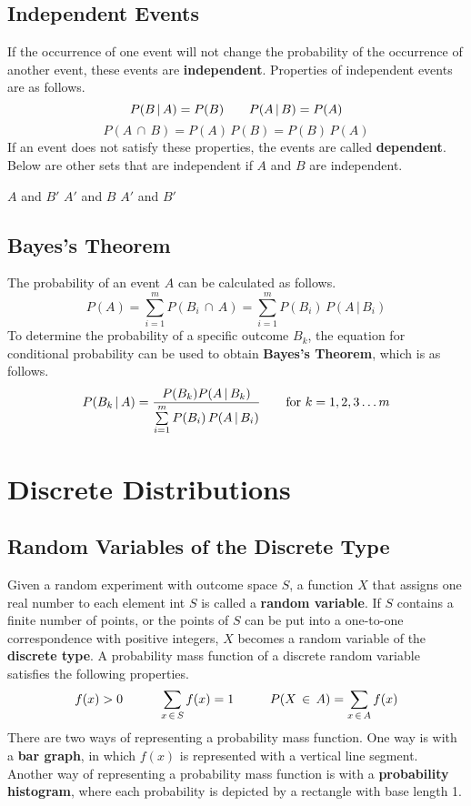 \documentclass{article}
\begin{document}
\subsection{Independent Events}
If the occurrence of one event will not change the probability of the occurrence of another event, these events are \textbf{independent}. Properties of independent events are as follows.
\[P(B\,|\,A)=P(B)\hspace{7 mm}P(A\,|\,B)=P(A)\]
\[P(A\,\cap\,B)=P(A)\,P(B)=P(B)\,P(A)\]
If an event does not satisfy these properties, the events are called \textbf{dependent}. Below are other sets that are independent if \(A\) and \(B\) are independent.
\begin{center}
    \(A\) and \(B'\)\hspace{7 mm}
    \(A'\) and \(B\)\hspace{7 mm}
    \(A'\) and \(B'\)
\end{center}
\subsection{Bayes's Theorem}
The probability of an event \(A\) can be calculated as follows.
\[P(A)=\sum_{i=1}^{m}P(B_i\,\cap\,A)=\sum_{i=1}^{m}P(B_i)\,P(A\,|\,B_i)\]
To determine the probability of a specific outcome \(B_k\), the equation for conditional probability can be used to obtain \textbf{Bayes's Theorem}, which is as follows.
\[P(B_k\,|\,A)=\frac{P(B_k)P(A\,|\,B_k)}{\sum\limits_{i=1}^{m}P(B_i)\,P(A\,|\,B_i)}\hspace{7 mm}\textnormal{for }k=1,2,3\hdots m\]
\section{Discrete Distributions}
\subsection{Random Variables of the Discrete Type}
Given a random experiment with outcome space \(S\), a function \(X\) that assigns one real number to each element int \(S\) is called a \textbf{random variable}. If \(S\) contains a finite number of points, or the points of \(S\) can be put into a one-to-one correspondence with positive integers, \(X\) becomes a random variable of the \textbf{discrete type}. A probability mass function of a discrete random variable satisfies the following properties.
\[f(x)>0\hspace{10mm}\sum\limits_{x\,\in\,S}f(x)=1\hspace{10 mm}P(X\,\in\,A)=\sum\limits_{x\,\in\,A}f(x)\]
There are two ways of representing a probability mass function. One way is with a \textbf{bar graph}, in which \(f(x)\) is represented with a vertical line segment. Another way  of representing a probability mass function is with a \textbf{probability histogram}, where each probability is depicted by a rectangle with base length 1.
\end{document}
